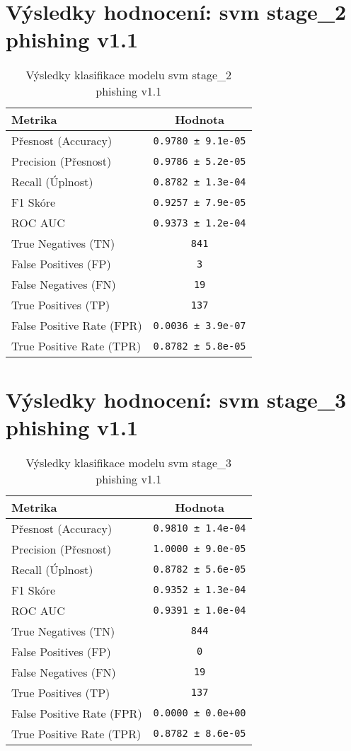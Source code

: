 \section*{Výsledky hodnocení: svm stage_2 phishing v1.1}
\begin{table}[h!]
\centering
\begin{tabular}{|l|c|}
\hline
\textbf{Metrika} & \textbf{Hodnota} \\
\hline
Přesnost (Accuracy) & \texttt{0.9780 ± 9.1e-05} \\
Precision (Přesnost) & \texttt{0.9786 ± 5.2e-05} \\
Recall (Úplnost) & \texttt{0.8782 ± 1.3e-04} \\
F1 Skóre & \texttt{0.9257 ± 7.9e-05} \\
ROC AUC & \texttt{0.9373 ± 1.2e-04} \\
True Negatives (TN) & \texttt{841} \\
False Positives (FP) & \texttt{3} \\
False Negatives (FN) & \texttt{19} \\
True Positives (TP) & \texttt{137} \\
False Positive Rate (FPR) & \texttt{0.0036 ± 3.9e-07} \\
True Positive Rate (TPR) & \texttt{0.8782 ± 5.8e-05} \\
\hline
\end{tabular}
\caption{Výsledky klasifikace modelu svm stage_2 phishing v1.1}
\label{tab:phishing_svm}
\end{table}

\section*{Výsledky hodnocení: svm stage_3 phishing v1.1}
\begin{table}[h!]
\centering
\begin{tabular}{|l|c|}
\hline
\textbf{Metrika} & \textbf{Hodnota} \\
\hline
Přesnost (Accuracy) & \texttt{0.9810 ± 1.4e-04} \\
Precision (Přesnost) & \texttt{1.0000 ± 9.0e-05} \\
Recall (Úplnost) & \texttt{0.8782 ± 5.6e-05} \\
F1 Skóre & \texttt{0.9352 ± 1.3e-04} \\
ROC AUC & \texttt{0.9391 ± 1.0e-04} \\
True Negatives (TN) & \texttt{844} \\
False Positives (FP) & \texttt{0} \\
False Negatives (FN) & \texttt{19} \\
True Positives (TP) & \texttt{137} \\
False Positive Rate (FPR) & \texttt{0.0000 ± 0.0e+00} \\
True Positive Rate (TPR) & \texttt{0.8782 ± 8.6e-05} \\
\hline
\end{tabular}
\caption{Výsledky klasifikace modelu svm stage_3 phishing v1.1}
\label{tab:phishing_svm}
\end{table}

